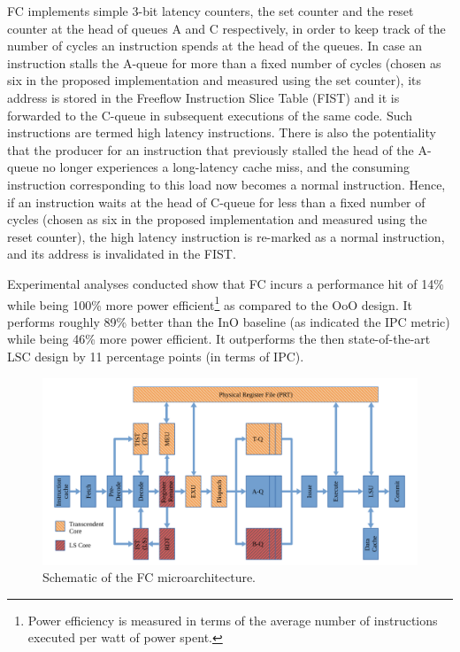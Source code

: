 \documentclass[a4paper,12pt, final]{report}
\begin{document}
FC implements simple 3-bit latency counters, the set counter and the reset counter at the head of queues A and C respectively, in order to keep track of the number of cycles an instruction spends at the head of the queues. In case an instruction stalls the A-queue for more than a fixed number of cycles (chosen as six in the proposed implementation and measured using the set counter), its address is stored in the Freeflow Instruction Slice Table (FIST) and it is forwarded to the C-queue in subsequent executions of the same code. Such instructions are termed high latency instructions. There is also the potentiality that the producer for an instruction that previously stalled the head of the A-queue no longer experiences a long-latency cache miss, and the consuming instruction corresponding to this load now becomes a normal instruction. Hence, if an instruction waits at the head of C-queue for less than a fixed number of cycles (chosen as six in the proposed implementation and measured using the reset counter), the high latency instruction is re-marked as a normal instruction, and its address is invalidated in the FIST.

Experimental analyses conducted show that FC incurs a performance hit of 14\% while being 100\% more power efficient\footnote[2]{Power efficiency is measured in terms of the average number of instructions executed per watt of power spent.} as compared to the OoO design. It performs roughly 89\% better than the InO baseline (as indicated the IPC metric) while being 46\% more power efficient. It outperforms the then state-of-the-art LSC design by 11 percentage points (in terms of IPC).

\begin{figure}[H]
    \begin{center}
    \includegraphics[width=\linewidth]{august22/img/freeflow.png}
    \caption{Schematic of the FC microarchitecture.}
    \end{center}
\end{figure}
\end{document}
